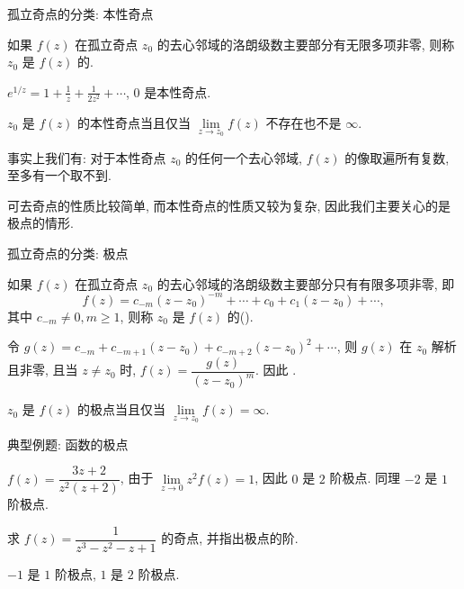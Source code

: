 \begin{frame}{孤立奇点的分类: 本性奇点}
\begin{definition}
如果 $f(z)$ 在孤立奇点 $z_0$ 的去心邻域的洛朗级数主要部分有无限多项非零, 则称 $z_0$ 是 $f(z)$ 的.
\end{definition}
\begin{example}
$\displaystyle e^{1/z}=1+\frac1z+\frac1{2z^2}+\cdots$, $0$ 是本性奇点.
\end{example}

\begin{conclusion}
$z_0$ 是 $f(z)$ 的本性奇点当且仅当 $\lim\limits_{z\to z_0}f(z)$ 不存在也不是 $\infty$.
\end{conclusion}

\onslide<+->
事实上我们有: 对于本性奇点 $z_0$ 的任何一个去心邻域, $f(z)$ 的像取遍所有复数, 至多有一个取不到.

\onslide<+->
可去奇点的性质比较简单, 而本性奇点的性质又较为复杂, 因此我们主要关心的是极点的情形.
\end{frame}


\begin{frame}{孤立奇点的分类: 极点}
\begin{definition}
如果 $f(z)$ 在孤立奇点 $z_0$ 的去心邻域的洛朗级数主要部分只有有限多项非零, 即
\[f(z)=c_{-m}(z-z_0)^{-m}+\cdots+c_0+c_1(z-z_0)+\cdots,\]
其中 $c_{-m}\neq 0,m\ge 1$, 则称 $z_0$ 是 $f(z)$ 的().
\end{definition}
\onslide<+->
令 $g(z)=c_{-m}+c_{-m+1}(z-z_0)+c_{-m+2}(z-z_0)^2+\cdots$, 则 $g(z)$ 在 $z_0$ 解析且非零, 且当 $z\neq z_0$ 时, $f(z)=\dfrac{g(z)}{(z-z_0)^m}$.
\onslide<+->
因此 .

\vspace{-2pt}
\begin{conclusion}
$z_0$ 是 $f(z)$ 的极点当且仅当 $\lim\limits_{z\to z_0}f(z)=\infty$.
\end{conclusion}
\end{frame}


\begin{frame}{典型例题: 函数的极点}
\begin{example}
$f(z)=\dfrac{3z+2}{z^2(z+2)}$,
\onslide<+->
由于 $\lim\limits_{z\to 0}z^2f(z)=1$, 因此 $0$ 是 $2$ 阶极点.
\onslide<+->
同理 $-2$ 是 $1$ 阶极点.
\end{example}

\begin{exercise}
求 $f(z)=\dfrac1{z^3-z^2-z+1}$ 的奇点, 并指出极点的阶.
\end{exercise}
\begin{answer}
$-1$ 是 $1$ 阶极点, $1$ 是 $2$ 阶极点.
\end{answer}
\end{frame}



